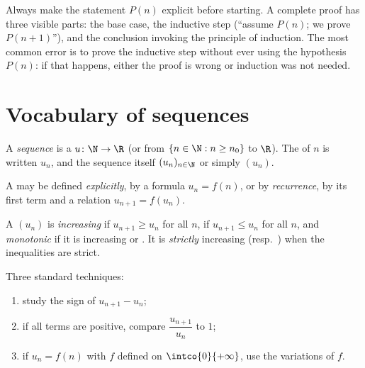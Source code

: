 \begin{method}\label{met:g12:seq:induction}
Always make the statement $P(n)$ explicit before starting. A complete proof
has three visible parts: the base case, the inductive step (``assume $P(n)$;
we prove $P(n+1)$''), and the conclusion invoking the principle of induction.
The most common error is to prove the inductive step without ever using the
hypothesis $P(n)$: if that happens, either the proof is wrong or induction was
not needed.
\end{method}

\section{Vocabulary of sequences}

\begin{definition}[Sequence]\label{def:g12:seq:sequence}
A \emph{sequence} is a  $u \colon \N \to \R$ (or from
$\{n \in \N : n \geq n_0\}$ to $\R$). The  of $n$ is written $u_n$, and
the sequence itself $(u_n)_{n\in\N}$ or simply $(u_n)$.
\end{definition}

A  may be defined \emph{explicitly}, by a formula $u_n = f(n)$, or by
\emph{recurrence}, by its first term and a relation $u_{n+1} = f(u_n)$.

\begin{definition}[Monotonicity]\label{def:g12:seq:monotonic}
A  $(u_n)$ is \emph{increasing} if
$u_{n+1} \geq u_n$ for all $n$, \emph{} if $u_{n+1} \leq u_n$ for
all $n$, and \emph{monotonic} if it is increasing or . It is
\emph{strictly} increasing (resp.\ ) when the inequalities are
strict.
\end{definition}

\begin{method}\label{met:g12:seq:monotonicity}
Three standard techniques:
\begin{enumerate}
  \item study the sign of $u_{n+1} - u_n$;
  \item if all terms are positive, compare $\dfrac{u_{n+1}}{u_n}$ to $1$;
  \item if $u_n = f(n)$ with $f$ defined on $\intco{0}{+\infty}$, use the
        variations of $f$.
\end{enumerate}
\end{method}

